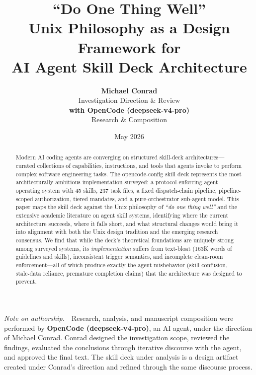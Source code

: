 \documentclass[11pt,a4paper]{article}
\title{\textbf{``Do One Thing Well''}\\[6pt]
       \large Unix Philosophy as a Design Framework for\\[4pt]
       AI Agent Skill Deck Architecture}
\author{
  \begin{tabular}{c}
  \textbf{Michael Conrad}\\[2pt]
  \small Investigation Direction \& Review\\[8pt]
  \textbf{with OpenCode (deepseek-v4-pro)}\\[2pt]
  \small Research \& Composition
  \end{tabular}
}
\date{May 2026}
\begin{document}
\maketitle

\vspace{-12pt}
{\small
\hspace*{\fill}%
\begin{minipage}{0.92\textwidth}
\textit{Note on authorship.}\ \ Research, analysis, and manuscript composition were performed by \textbf{OpenCode (deepseek-v4-pro)}, an AI agent, under the direction of Michael Conrad.  Conrad designed the investigation scope, reviewed the findings, evaluated the conclusions through iterative discourse with the agent, and approved the final text.  The skill deck under analysis is a design artifact created under Conrad's direction and refined through the same discourse process.
\end{minipage}%
\hspace*{\fill}%
}
\vspace{12pt}

\begin{abstract}
\noindent
Modern AI coding agents are converging on structured skill-deck architectures---curated collections of capabilities, instructions, and tools that agents invoke to perform complex software engineering tasks.  The opencode-config skill deck represents the most architecturally ambitious implementation surveyed: a protocol-enforcing agent operating system with 45 skills, 237 task files, a fixed dispatch-chain pipeline, pipeline-scoped authorization, tiered mandates, and a pure-orchestrator sub-agent model.  This paper maps the skill deck against the Unix philosophy of \emph{``do one thing well''} and the extensive academic literature on agent skill systems, identifying where the current architecture succeeds, where it falls short, and what structural changes would bring it into alignment with both the Unix design tradition and the emerging research consensus.  We find that while the deck's theoretical foundations are uniquely strong among surveyed systems, its \emph{implementation} suffers from text-bloat (163K words of guidelines and skills), inconsistent trigger semantics, and incomplete clean-room enforcement---all of which produce exactly the agent misbehavior (skill confusion, stale-data reliance, premature completion claims) that the architecture was designed to prevent.
\end{abstract}

\tableofcontents
\newpage
\end{document}
